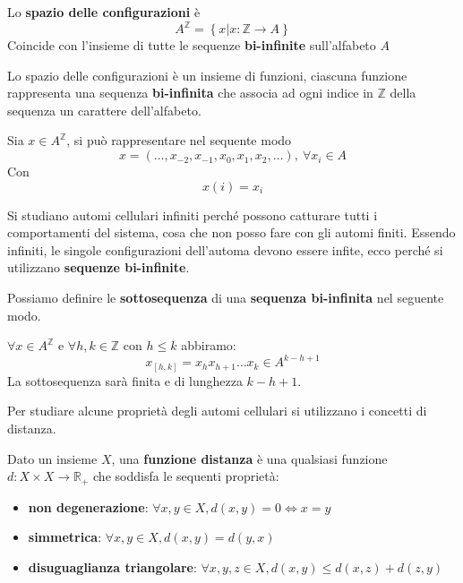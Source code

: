 \begin{definizione}
    Lo \textbf{spazio delle configurazioni} è
    $$A^\mathbb{Z}= \left\{x|x:\mathbb{Z}\rightarrow A\right\}$$
    Coincide con l'insieme di tutte le sequenze \textbf{bi-infinite} sull'alfabeto
    $A$
\end{definizione}
Lo spazio delle configurazioni è un insieme di funzioni, ciascuna funzione rappresenta
una sequenza \textbf{bi-infinita} che associa ad ogni indice in $\mathbb{Z}$ della
sequenza un carattere dell'alfabeto.
\begin{esempio}
    Sia $x\in A^\mathbb{Z}$, si può rappresentare nel sequente modo
    $$x = \left(\dots, x_{-2}, x_{-1},x_{0},x_{1},x_{2},\dots\right), \ \forall x_i\in A$$
    Con
    $$x(i) = x_i$$
\end{esempio}

Si studiano automi cellulari infiniti perché possono catturare tutti i comportamenti
del sistema, cosa che non posso fare con gli automi finiti. Essendo infiniti,
le singole configurazioni dell'automa devono essere infite, ecco perché si utilizzano
\textbf{sequenze bi-infinite}.

\begin{definizione} 
    Possiamo definire le \textbf{sottosequenza} di una \textbf{sequenza bi-infinita}
    nel seguente modo.

    $\forall x \in A^{\mathbb{Z}}$ e $\forall h,k\in \mathbb{Z}$ con $h\le k$
    abbiramo:
    $$x_{[h,k]}= x_hx_{h+1}\dots x_k\in A^{k-h+1}$$
    La sottosequenza sarà finita e di lunghezza $k-h+1$.
\end{definizione}

Per studiare alcune proprietà degli automi cellulari si utilizzano i concetti di
distanza.
\begin{definizione}
    Dato un insieme $X$, una \textbf{funzione distanza} è una qualsiasi funzione
    $d:X\times X \rightarrow \mathbb{R}_+$ che soddisfa le sequenti proprietà:
    \begin{itemize}
        \item \textbf{non degenerazione}: $\forall x,y\in X, d(x,y) = 0\iff x=y$
        \item \textbf{simmetrica}: $\forall x,y\in X, d(x,y) = d(y,x)$
        \item \textbf{disuguaglianza triangolare}: $\forall x,y,z\in X, d(x,y) \le d(x,z)+d(z,y)$
    \end{itemize}
\end{definizione}

